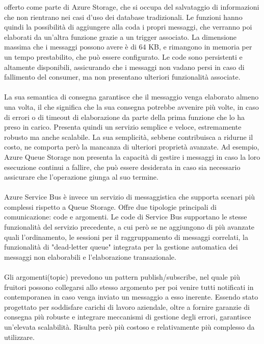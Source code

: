 offerto come parte di Azure Storage,
che si occupa del salvataggio di informazioni
che non rientrano nei casi d'uso dei database tradizionali.
Le funzioni hanno quindi la possibilità di aggiungere alla coda i propri messaggi,
che verranno poi elaborati da un'altra funzione grazie a un trigger associato.
La dimensione massima che i messaggi possono avere è di 64 KB,
e rimangono in memoria per un tempo prestabilito, che può essere configurato.
Le code sono persistenti e altamente disponibili,
assicurando che i messaggi non vadano persi in caso di fallimento del consumer,
ma non presentano ulteriori funzionalità associate.\\
\\
La sua semantica di consegna garantisce che il messaggio venga elaborato almeno una volta,
il che significa che la sua consegna potrebbe avvenire più volte,
in caso di errori o di timeout di elaborazione da parte della prima funzione che lo ha preso in carico.
Presenta quindi un servizio semplice e veloce,
estremamente robusto ma anche scalabile.
La sua semplicità, sebbene contribuisca a ridurne il costo,
ne comporta però la mancanza di ulteriori proprietà avanzate.
Ad esempio, Azure Queue Storage non presenta la capacità
di gestire i messaggi in caso la loro esecuzione continui a fallire,
che può essere desiderata in caso sia necessario assicurare che l'operazione giunga al suo termine.\\
\\
Azure Service Bus è invece un servizio di messaggistica
che supporta scenari più complessi rispetto a Queue Storage.
Offre due tipologie principali di comunicazione: code e argomenti.
Le code di Service Bus supportano le stesse funzionalità del servizio precedente,
a cui però se ne aggiungono di più avanzate quali l'ordinamento,
le sessioni per il raggruppamento di messaggi correlati,
la funzionalità di "dead-letter queue" integrata per la gestione automatica dei messaggi non elaborabili e
l'elaborazione transazionale.\\
\\
Gli argomenti(topic) prevedono un pattern publish/subscribe,
nel quale più fruitori possono collegarsi allo stesso argomento per poi
venire tutti notificati in contemporanea in caso venga inviato un messaggio a esso inerente.
Essendo stato progettato per soddisfare carichi di lavoro aziendale,
oltre a fornire garanzie di consegna più robuste e
integrare meccanismi di gestione degli errori,
garantisce un'elevata scalabilità.
Risulta però più costoso e relativamente più complesso da utilizzare.\\
